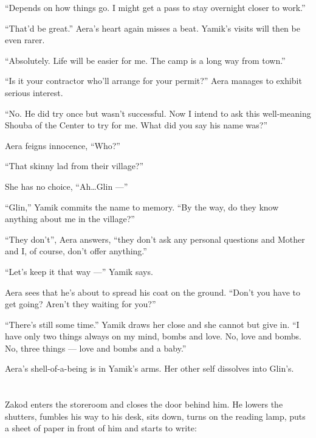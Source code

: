 \documentclass[twoside,11pt,openany]{book}
\begin{document}
``Depends on how things go. I might get a pass to stay overnight closer to work.''

``That'd be great.'' Aera's heart again misses a beat. Yamik's visits will then be even rarer.

``Absolutely. Life will be easier for me. The camp is a long way from town.''

``Is it your contractor who'll arrange for your permit?'' Aera manages to exhibit serious interest.

``No. He did try once but wasn't successful. Now I intend to ask this well-meaning Shouba of the Center to try for me.
What did you say his name was?''

Aera feigns innocence, ``Who?''

``That skinny lad from their village?''

She has no choice, ``Ah{\ldots}Glin ---''

``Glin,{}'' Yamik commits the name to memory. ``By the way, do they know anything about me in the
village?''

``They don't'', Aera answers, ``they don't ask any personal questions and Mother
and I, of course, don't offer anything.''

``Let's keep it that way ---'' Yamik says.

Aera sees that he's about to spread his coat on the ground. ``Don't you have to get going? Aren't they waiting for
you?''

``There's still some time.'' Yamik draws her close and she cannot but give in. ``I have only two things always on my
mind, bombs and love. No, love and bombs. No, three things --- love and bombs and a baby.''

Aera's shell-of-a-being is in Yamik's arms.{ }Her other self dissolves into Glin's.



\chapter{}

Zakod enters the storeroom and closes the door behind him. He lowers the shutters, fumbles his way to his desk, sits
down, turns on the reading lamp, puts a sheet of paper in front of him and starts to write:
\end{document}
